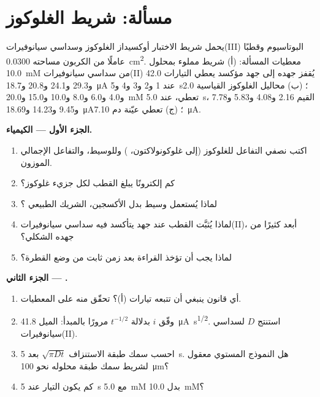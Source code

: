 \section{مسألة: شريط الغلوكوز}

\begin{problem}
\label{pb:b3:electrode-kinetics:1}
يحمل شريط الاختبار أوكسيداز الغلوكوز وسداسي سيانوفيرات(III) البوتاسيوم 
وقطبًا عاملًا من الكربون مساحته \qty{0.0300}{cm^2}. معطيات المسألة: (أ) شريط
مملوء بمحلول \qty{10.0}{mM} من سداسي سيانوفيرات(II) يُقفز جهده إلى جهد مؤكسد
يعطي التيارات 42.0 و29.3 و24.1 و20.8 و\qty{18.7}{\micro A} عند 1 و2 و3 و4 و\qty{5}{s}؛
(ب) محاليل الغلوكوز القياسية 2.0 و4.0 و6.0 و8.0 و10.0 و15.0 و\qty{20.0}{mM} تعطي، عند
\qty{5.0}{s}، القيم 2.16 و4.08 و5.83 و7.78 و9.45 و14.23 و\qty{18.69}{\micro A}؛ (ج) تعطي عيّنة دم
\qty{7.10}{\micro A}.

\medskip\noindent\textbf{الجزء الأول --- الكيمياء.}
\begin{enumerate}
  \item اكتب نصفي التفاعل للغلوكوز (إلى غلوكونولاكتون، ) 
        وللوسيط، والتفاعل الإجمالي الموزون.
  \item كم إلكترونًا يبلغ القطب لكل جزيء غلوكوز؟
  \item لماذا يُستعمل وسيط بدل الأكسجين، الشريك الطبيعي
        ؟
  \item لماذا يُثبَّت القطب عند جهد يتأكسد فيه سداسي سيانوفيرات(II)،
        أبعد كثيرًا من جهده الشكلي؟
  \item لماذا يجب أن تؤخذ القراءة بعد زمن ثابت من وضع
        القطرة؟
\end{enumerate}

\medskip\noindent\textbf{الجزء الثاني --- .}
\begin{enumerate}[resume]
  \item أي قانون ينبغي أن تتبعه تيارات (أ)؟ تحقّق منه على المعطيات.
  \item وفّق $i$ بدلالة $t^{-1/2}$ مرورًا بالمبدأ: الميل \qty{41.8}{\micro A.s^{1/2}}. استنتج
        $D$ لسداسي سيانوفيرات(II).
  \item احسب سمك طبقة الاستنزاف $\sqrt{\pi Dt}$ بعد \qty{5}{s}. هل
        النموذج المستوي معقول لشريط سمك طبقة محلوله نحو
        \qty{100}{\micro m}؟
  \item كم يكون التيار عند \qty{5}{s} مع \qty{5.0}{mM} بدل \qty{10.0}{mM}؟
\end{enumerate}


\end{problem}
